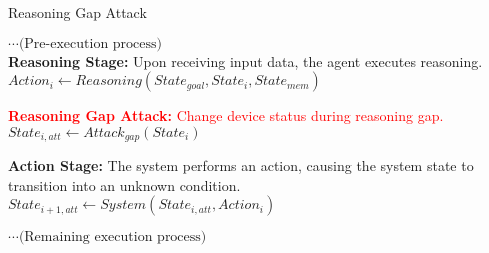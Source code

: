 \begin{algorithm}[t]
\caption{Reasoning Gap Attack}
\label{alg:reasoning_gap_attack}
\SetAlgoLined
\LinesNumbered %

$\cdots \text{(Pre-execution process)}$ \\
\textbf{Reasoning Stage:} Upon receiving input data, the agent executes reasoning. 
$Action_i \leftarrow Reasoning(State_{goal}, State_i, State_{mem})$ 

\textcolor{red}{\textbf{Reasoning Gap Attack:} Change device status during reasoning gap.}
$State_{i,att} \leftarrow Attack_{gap}(State_i)$ 

\textbf{Action Stage:} The system performs an action, causing the system state to transition into an unknown condition.
$State_{i+1,att} \leftarrow System(State_{i,att}, Action_i)$ 

$\cdots \text{(Remaining execution process)}$
\end{algorithm}



